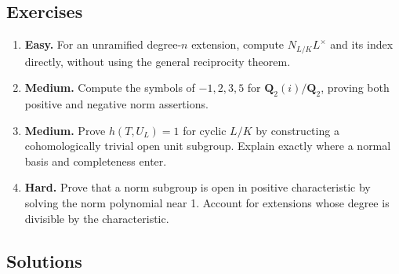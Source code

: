 \documentclass[11pt,a4paper]{article}
\newcommand{\tightlist}{\setlength{\itemsep}{0pt}\setlength{\parskip}{0pt}}
\begin{document}
\subsection{Exercises}\label{exercises}

\begin{enumerate}
\def\labelenumi{\arabic{enumi}.}
\tightlist
\item
  \textbf{Easy.} For an unramified degree-\(n\) extension, compute
  \(N_{L/K}L^\times\) and its index directly, without using the general
  reciprocity theorem.
\item
  \textbf{Medium.} Compute the symbols of \(-1,2,3,5\) for
  \(\mathbf Q_2(i)/\mathbf Q_2\), proving both positive and negative
  norm assertions.
\item
  \textbf{Medium.} Prove \(h(T,U_L)=1\) for cyclic \(L/K\) by
  constructing a cohomologically trivial open unit subgroup. Explain
  exactly where a normal basis and completeness enter.
\item
  \textbf{Hard.} Prove that a norm subgroup is open in positive
  characteristic by solving the norm polynomial near 1. Account for
  extensions whose degree is divisible by the characteristic.
\end{enumerate}

\subsection{Solutions}\label{solutions}
\end{document}

